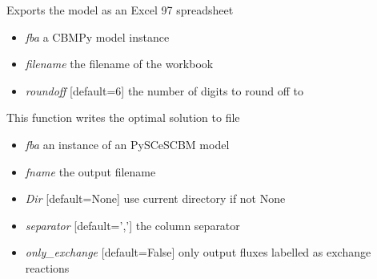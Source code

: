 \documentclass[a4paper,11pt,english]{sphinxmanual}
\begin{document}

\begin{fulllineitems}
\label{modules_doc:cbmpy.CBWrite.writeModelToExcel97}
Exports the model as an Excel 97 spreadsheet
\begin{itemize}
\item {} 
\emph{fba} a CBMPy model instance

\item {} 
\emph{filename} the filename of the workbook

\item {} 
\emph{roundoff} {[}default=6{]} the number of digits to round off to

\end{itemize}

\end{fulllineitems}


\begin{fulllineitems}
\label{modules_doc:cbmpy.CBWrite.writeOptimalSolution}
This function writes the optimal solution to file
\begin{itemize}
\item {} 
\emph{fba} an instance of an PySCeSCBM model

\item {} 
\emph{fname} the output filename

\item {} 
\emph{Dir} {[}default=None{]} use current directory if not None

\item {} 
\emph{separator} {[}default=','{]} the column separator

\item {} 
\emph{only\_exchange} {[}default=False{]} only output fluxes labelled as exchange reactions

\end{itemize}

\end{fulllineitems}

\end{document}
